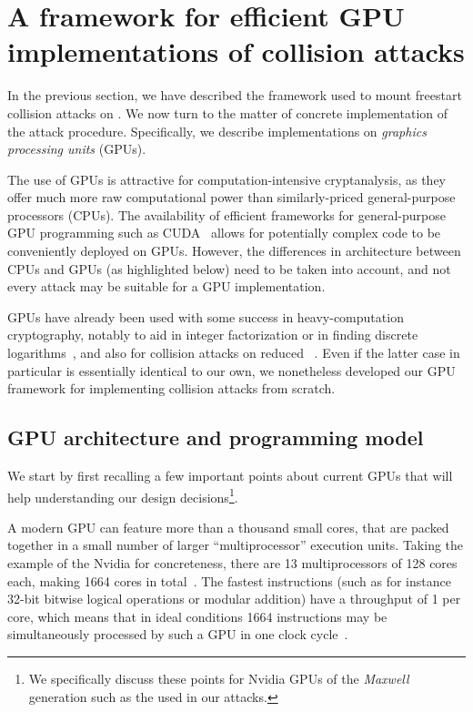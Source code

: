 \section{A framework for efficient GPU implementations of collision attacks}

In the previous section, we have described the framework used to mount freestart collision attacks on \shaone. We now turn to
the matter of concrete implementation of the attack procedure. Specifically, we describe implementations on \emph{graphics processing
units} (GPUs).

The use of GPUs is attractive for computation-intensive cryptanalysis, as they offer much more raw computational power than
similarly-priced general-purpose processors (\ie CPUs). The availability of efficient frameworks for general-purpose GPU programming such as CUDA~\cite{cuda} allows
for potentially complex code to be conveniently deployed on GPUs. However, the differences in architecture between CPUs and GPUs
(as highlighted below) need to be taken into account, and not every attack may be suitable for a GPU implementation.

GPUs have already been used with some success in heavy-computation cryptography, notably to aid in integer factorization or in finding discrete
logarithms~\cite{DBLP:conf/asiacrypt/BosK12,DBLP:conf/ches/MieleBKL14,DBLP:conf/eurocrypt/BarbulescuGGM15,DBLP:phd/hal/Jeljeli15}, and also for collision attacks on reduced \shaone~\cite{cryptoeprint:2011:641}.
Even if the latter case in particular is essentially identical to our own, we nonetheless developed our GPU framework for implementing collision attacks from scratch.

\subsection{GPU architecture and programming model}

We start by first recalling a few important points about current GPUs that will help
understanding our design decisions\footnote{We specifically discuss these points
for Nvidia GPUs of the \emph{Maxwell} generation such as the \gtx
used in our attacks.}.

A modern GPU can feature more
than a thousand small cores, that are packed together in a small
number of larger ``multiprocessor'' execution units. Taking the example of the
Nvidia \gtx for concreteness, there are 13 multiprocessors of 128 cores each,
making 1664 cores in total~\cite{gtx970_specs}. The fastest instructions
(such as for instance 32-bit bitwise logical operations or modular addition) have a throughput of 1 per core,
which means that in ideal conditions 1664 instructions may be simultaneously processed by such a GPU in one clock
cycle~\cite{cuda_prog_guide}.

